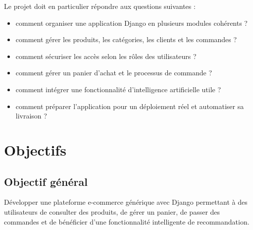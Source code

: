 \documentclass[11pt,a4paper]{report}
\begin{document}
Le projet doit en particulier répondre aux questions suivantes :
\begin{itemize}[leftmargin=1.4em]
  \item comment organiser une application Django en plusieurs modules cohérents ?
  \item comment gérer les produits, les catégories, les clients et les commandes ?
  \item comment sécuriser les accès selon les rôles des utilisateurs ?
  \item comment gérer un panier d'achat et le processus de commande ?
  \item comment intégrer une fonctionnalité d'intelligence artificielle utile ?
  \item comment préparer l'application pour un déploiement réel et automatiser sa
        livraison ?
\end{itemize}

\chapter{Objectifs}

\section{Objectif général}
Développer une plateforme e-commerce générique avec Django permettant à des
utilisateurs de consulter des produits, de gérer un panier, de passer des
commandes et de bénéficier d'une fonctionnalité intelligente de recommandation.
\end{document}
